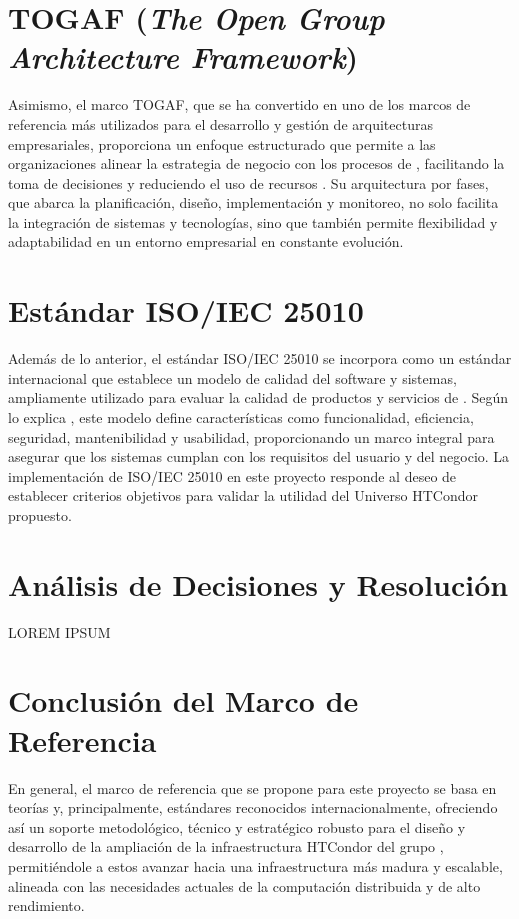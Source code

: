 \section{TOGAF (\textit{The Open Group Architecture Framework})}
\noindent
Asimismo, el marco TOGAF, que se ha convertido en uno de los marcos de referencia más utilizados para el desarrollo y gestión de arquitecturas empresariales, proporciona un enfoque estructurado que permite a las organizaciones alinear la estrategia de negocio con los procesos de \TI, facilitando la toma de decisiones y reduciendo el uso de recursos \citep{Mumtaza2025}. Su arquitectura por fases, que abarca la planificación, diseño, implementación y monitoreo, no solo facilita la integración de sistemas y tecnologías, sino que también permite flexibilidad y adaptabilidad en un entorno empresarial en constante evolución.

\section{Estándar ISO/IEC 25010}
\noindent
Además de lo anterior, el estándar ISO/IEC 25010 se incorpora como un estándar internacional que establece un modelo de calidad del software y sistemas, ampliamente utilizado para evaluar la calidad de productos y servicios de \TI. Según lo explica \cite{ISO25010}, este modelo define características como funcionalidad, eficiencia, seguridad, mantenibilidad y usabilidad, proporcionando un marco integral para asegurar que los sistemas cumplan con los requisitos del usuario y del negocio. La implementación de ISO/IEC 25010 en este proyecto responde al deseo de establecer criterios objetivos para validar la utilidad del Universo HTCondor propuesto.


\section{Análisis de Decisiones y Resolución} %
LOREM IPSUM



\section{Conclusión del Marco de Referencia}
\noindent
En general, el marco de referencia que se propone para este proyecto se basa en teorías y, principalmente, estándares reconocidos internacionalmente, ofreciendo así un soporte metodológico, técnico y estratégico robusto para el diseño y desarrollo de la ampliación de la infraestructura HTCondor del grupo \GRID, permitiéndole a estos avanzar hacia una infraestructura más madura y escalable, alineada con las necesidades actuales de la computación distribuida y de alto rendimiento.
